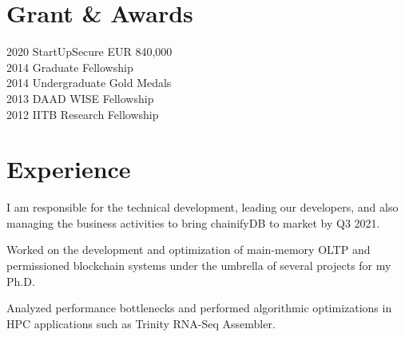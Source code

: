 \documentclass[]{deedy-resume-openfont}
\begin{document}
\begin{minipage}[t]{0.29\textwidth}
\section{Grant \& Awards}
2020 \textbullet{}  StartUpSecure EUR 840,000 \\
2014 \textbullet{}  Graduate Fellowship \\
2014 \textbullet{}  Undergraduate Gold Medals \\
2013 \textbullet{}  DAAD WISE Fellowship \\
2012 \textbullet{}  IITB Research Fellowship
\sectionsep

%
%

\end{minipage} 
\hfill
\begin{minipage}[t]{0.66\textwidth}
	

\section{Experience}

I am responsible for the technical development, leading our developers, and also managing the business activities to bring chainifyDB to market by Q3 2021.

\sectionsep

Worked on the development and optimization of main-memory OLTP and permissioned blockchain systems under the umbrella of several projects for my Ph.D.

\sectionsep
{}
Analyzed performance bottlenecks and performed algorithmic optimizations in HPC applications such as Trinity RNA-Seq Assembler.

\sectionsep



\end{minipage}
\end{document}
